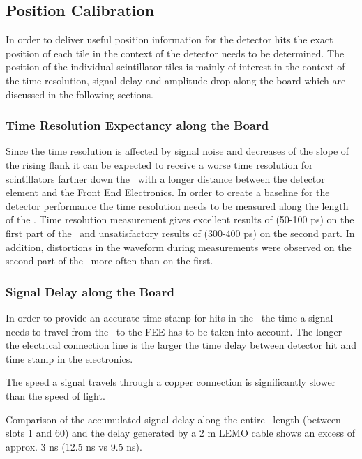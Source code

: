 \documentclass[../BTOF_summary.tex]{subfiles}
\begin{document}
\subsection{Position Calibration}

In order to deliver useful position information for the detector hits the exact position of each tile in the context of the detector needs to be determined.
The position of the individual scintillator tiles is mainly of interest in the context of the time resolution, signal delay and amplitude drop along the board which are discussed in the following sections.

\subsubsection{Time Resolution Expectancy along the Board}

Since the time resolution is affected by signal noise and decreases of the slope of the rising flank it can be expected to receive a worse time resolution for scintillators farther down the \railboard\ with a longer distance between the detector element and the Front End Electronics.
In order to create a baseline for the detector performance the time resolution needs to be measured along the length of the \railboard .
Time resolution measurement gives excellent results of (50-100 ps) on the first part of the \railboard\ and unsatisfactory results of (300-400 ps) on the second part. In addition, distortions in the waveform during measurements were observed on the second part of the \railboard\ more often than on the first. 

\subsubsection{Signal Delay along the Board}

In order to provide an accurate time stamp for hits in the \btofD\ the time a signal needs to travel from the \sipms\ to the FEE has to be taken into account. The longer the electrical connection line is the larger the time delay between detector hit and time stamp in the electronics.

The speed a signal travels through a copper connection is significantly slower than the speed of light.

Comparison of the accumulated signal delay along the entire \railboard\ length (between slots 1 and 60) and the delay generated by a 2 m LEMO cable shows an excess of approx. 3 ns (12.5 ns vs 9.5 ns).
\end{document}
